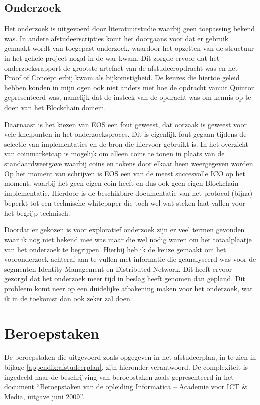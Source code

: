 \subsection{Onderzoek}

Het onderzoek is uitgevoerd door literatuurstudie waarbij geen toepassing bekend was. In andere afstudeerscripties komt het doorgaans voor dat er gebruik gemaakt wordt van toegepast onderzoek, waardoor het opzetten van de structuur in het gehele project nogal in de war kwam. Dit zorgde ervoor dat het onderzoeksrapport de grootste artefact van de afstudeeropdracht was en het Proof of Concept erbij kwam als bijkomstigheid. De keuzes die hiertoe geleid hebben konden in mijn ogen ook niet anders met hoe de opdracht vanuit Quintor gepresenteerd was, namelijk dat de insteek van de opdracht was om kennis op te doen van het Blockchain domein.

Daarnaast is het kiezen van EOS een fout geweest, dat oorzaak is geweest voor vele knelpunten in het onderzoeksproces. Dit is eigenlijk fout gegaan tijdens de selectie van implementaties en de bron die hiervoor gebruikt is. In het overzicht van coinmarketcap is mogelijk om alleen coins te tonen in plaats van de standaardweergave waarbij coins en tokens door elkaar heen weergegeven worden. Op het moment van schrijven is EOS een van de meest succesvolle \acrfull{ICO} op het moment, waarbij het geen eigen coin heeft en dus ook geen eigen Blockchain implementatie. Hierdoor is de beschikbare documentatie van het protocol (bijna) beperkt tot een technische whitepaper die toch wel wat steken laat vallen voor het begrijp technisch.

Doordat er gekozen is voor exploratief onderzoek zijn er veel termen gevonden waar ik nog niet bekend mee was maar die wel nodig waren om het totaalplaatje van het onderzoek te begrijpen. Hierbij heb ik de keuze gemaakt om het vooronderzoek achteraf aan te vullen met informatie die geanalyseerd was voor de segmenten Identity Management en Distributed Network. Dit heeft ervoor gezorgd dat het onderzoek meer tijd in beslag heeft genomen dan gepland. Dit probleem komt neer op een duidelijke afbakening maken voor het onderzoek, wat ik in de toekomst dan ook zeker zal doen.

\section{Beroepstaken}

De beroepstaken die uitgevoerd zoals opgegeven in het afstudeerplan, in te zien in bijlage \ref{appendix:afstudeerplan}, zijn hieronder verantwoord. De complexiteit is ingedeeld naar de beschrijving van beroepstaken zoals gepresenteerd in het document ``Beroepstaken van de opleiding Informatica -- Academie voor ICT \& Media, uitgave juni 2009''.

